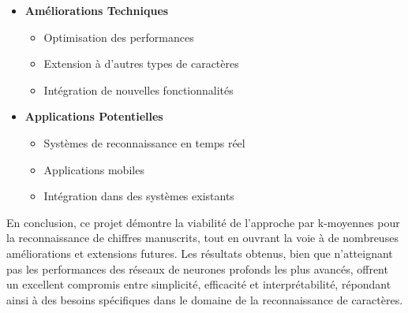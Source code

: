 \begin{itemize}
    \item \textbf{Améliorations Techniques}
    \begin{itemize}
        \item Optimisation des performances
        \item Extension à d'autres types de caractères
        \item Intégration de nouvelles fonctionnalités
    \end{itemize}

    \item \textbf{Applications Potentielles}
    \begin{itemize}
        \item Systèmes de reconnaissance en temps réel
        \item Applications mobiles
        \item Intégration dans des systèmes existants
    \end{itemize}
\end{itemize}

En conclusion, ce projet démontre la viabilité de l'approche par k-moyennes pour la reconnaissance de chiffres manuscrits, tout en ouvrant la voie à de nombreuses améliorations et extensions futures. Les résultats obtenus, bien que n'atteignant pas les performances des réseaux de neurones profonds les plus avancés, offrent un excellent compromis entre simplicité, efficacité et interprétabilité, répondant ainsi à des besoins spécifiques dans le domaine de la reconnaissance de caractères.